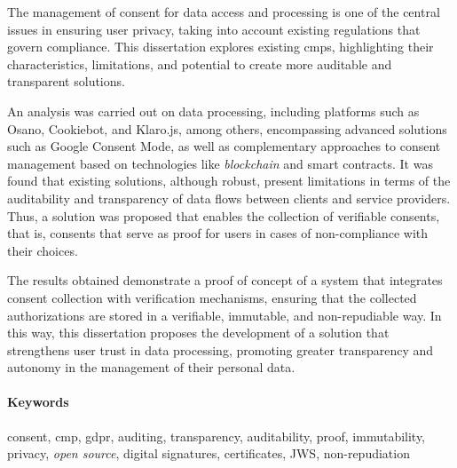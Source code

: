 The management of consent for data access and processing is one of the central issues in ensuring user privacy, taking into account existing regulations that govern compliance. This dissertation explores existing \acrfull{cmp}s, highlighting their characteristics, limitations, and potential to create more auditable and transparent solutions. 

An analysis was carried out on data processing, including platforms such as Osano, Cookiebot, and Klaro.js, among others, encompassing advanced solutions such as Google Consent Mode, as well as complementary approaches to consent management based on technologies like \textit{blockchain} and smart contracts. It was found that existing solutions, although robust, present limitations in terms of the auditability and transparency of data flows between clients and service providers. Thus, a solution was proposed that enables the collection of verifiable consents, that is, consents that serve as proof for users in cases of non-compliance with their choices. 

The results obtained demonstrate a proof of concept of a system that integrates consent collection with verification mechanisms, ensuring that the collected authorizations are stored in a verifiable, immutable, and non-repudiable way. In this way, this dissertation proposes the development of a solution that strengthens user trust in data processing, promoting greater transparency and autonomy in the management of their personal data.

\paragraph{Keywords} consent, \acrshort{cmp}, \acrshort{gdpr}, auditing, transparency, auditability, proof, immutability, privacy, \textit{open source}, digital signatures, certificates, JWS, non-repudiation

\cleardoublepage
